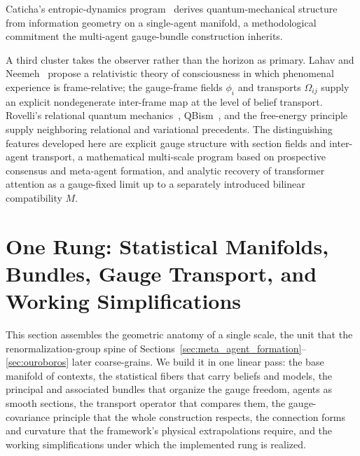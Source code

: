 \documentclass[11pt]{article}
\begin{document}
Caticha's entropic-dynamics program~\cite{Caticha2019} derives quantum-mechanical structure from information geometry on a single-agent manifold, a methodological commitment the multi-agent gauge-bundle construction inherits.

A third cluster takes the observer rather than the horizon as primary. Lahav and Neemeh~\cite{LahavNeemeh2022, LahavNeemeh2025} propose a relativistic theory of consciousness in which phenomenal experience is frame-relative; the gauge-frame fields $\phi_i$ and transports $\Omega_{ij}$ supply an explicit nondegenerate inter-frame map at the level of belief transport. Rovelli's relational quantum mechanics~\cite{Rovelli1996}, QBism~\cite{Fuchs2014}, and the free-energy principle~\cite{Friston2010, Friston2017, parr2022active} supply neighboring relational and variational precedents. The distinguishing features developed here are explicit gauge structure with section fields and inter-agent transport, a mathematical multi-scale program based on prospective consensus and meta-agent formation, and analytic recovery of transformer attention as a gauge-fixed limit up to a separately introduced bilinear compatibility $M$.

\section{One Rung: Statistical Manifolds, Bundles, Gauge Transport, and Working Simplifications}\label{sec:one_rung}

This section assembles the geometric anatomy of a single scale, the unit that the renormalization-group spine of Sections~\ref{sec:meta_agent_formation}--\ref{sec:ouroboros} later coarse-grains. We build it in one linear pass: the base manifold of contexts, the statistical fibers that carry beliefs and models, the principal and associated bundles that organize the gauge freedom, agents as smooth sections, the transport operator that compares them, the gauge-covariance principle that the whole construction respects, the connection forms and curvature that the framework's physical extrapolations require, and the working simplifications under which the implemented rung is realized.
\end{document}
